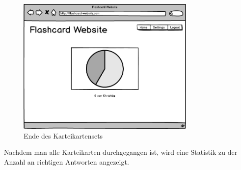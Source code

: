 \begin{figure}[H]
    \centering
    \includegraphics[width=0.78\textwidth]{images/Lernscreen-Ergebnis.png}
    \caption{Ende des Karteikartensets}
    \label{fig:lernscreen-ergbenis}
\end{figure}

\noindent Nachdem man alle Karteikarten durchgegangen ist, wird eine Statistik zu der Anzahl an richtigen Antworten angezeigt.
